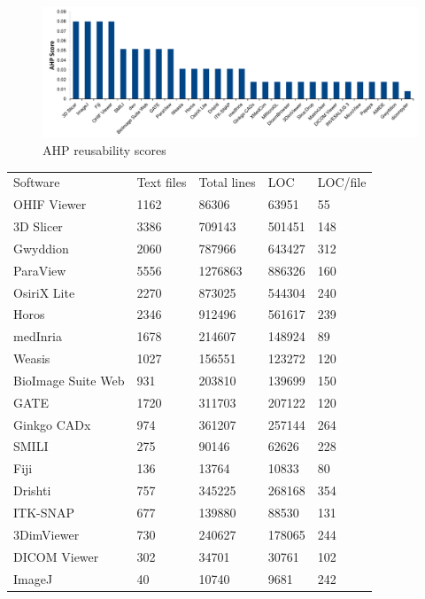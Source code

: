 \documentclass[final, 3p, times, authoryear]{elsarticle}
\begin{document}
\begin{figure}[!ht]
\includegraphics[scale=0.48]{figures/reusability_scores.pdf}
\caption{AHP reusability scores}
\label{fg_reusability_scores}
\end{figure}

\begin{table}[!ht]
\centering
\begin{tabular}{lllll}
\toprule
\multirow{2}{*}{Software} & \multirow{2}{*}{Text files} & \multirow{2}{*}{Total lines} & \multirow{2}{*}{LOC} & \multirow{2}{*}{LOC/file} \\
 &  &  &  &  \\ 
\midrule
OHIF Viewer & 1162 & 86306 & 63951 & 55 \\
3D Slicer & 3386 & 709143 & 501451 & 148 \\
Gwyddion & 2060 & 787966 & 643427 & 312 \\
ParaView & 5556 & 1276863 & 886326 & 160 \\
OsiriX Lite & 2270 & 873025 & 544304 & 240 \\
Horos & 2346 & 912496 & 561617 & 239 \\
medInria & 1678 & 214607 & 148924 & 89 \\
Weasis & 1027 & 156551 & 123272 & 120 \\
BioImage Suite Web & 931 & 203810 & 139699 & 150 \\
GATE & 1720 & 311703 & 207122 & 120 \\
Ginkgo CADx & 974 & 361207 & 257144 & 264 \\
SMILI & 275 & 90146 & 62626 & 228 \\
Fiji & 136 & 13764 & 10833 & 80 \\
Drishti & 757 & 345225 & 268168 & 354 \\
ITK-SNAP & 677 & 139880 & 88530 & 131 \\
3DimViewer & 730 & 240627 & 178065 & 244 \\
DICOM Viewer & 302 & 34701 & 30761 & 102 \\
ImageJ & 40 & 10740 & 9681 & 242 \\

\end{tabular}
\end{table}
\end{document}
